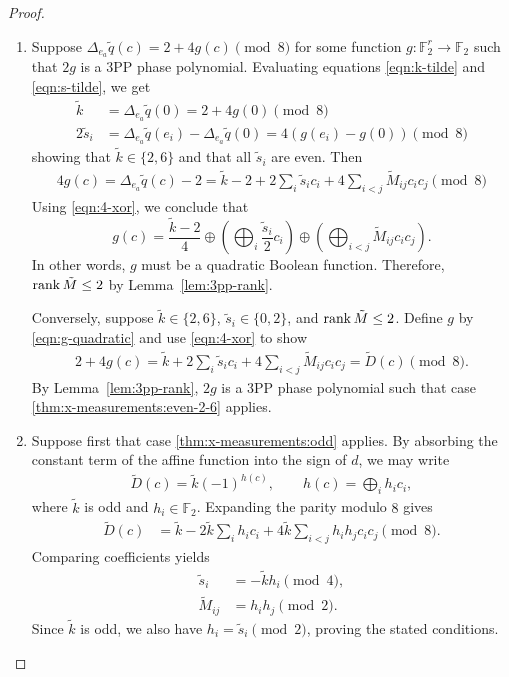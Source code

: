\begin{proof}
\begin{enumerate}
\item
Suppose $\Delta_{e_a}\tilde q(c) = 2 + 4g(c) \pmod 8$ for some function $g: \mathbb F_2^r \to \mathbb F_2$ such that $2g$ is a 3PP phase polynomial.
Evaluating equations \eqref{eqn:k-tilde} and \eqref{eqn:s-tilde}, we get
\begin{align*}
    \tilde k &= \Delta_{e_a}\tilde q(0) = 2 + 4g(0) \pmod 8 \\
    2\tilde s_i &= \Delta_{e_a}\tilde q(e_i) - \Delta_{e_a}\tilde q(0) = 4(g(e_i) - g(0)) \pmod 8
\end{align*}
showing that $\tilde k \in \{2,6\}$ and that all $\tilde s_i$ are even.
Then
\begin{align*}
    4g(c)
    = \Delta_{e_a}\tilde q(c) - 2
    = \tilde k - 2 + 2\sum_i \tilde s_ic_i + 4\sum_{i<j} \tilde M_{ij}c_ic_j \pmod 8
\end{align*}
Using \cref{eqn:4-xor}, we conclude that
\begin{equation} \label{eqn:g-quadratic}
    g(c) = \frac{\tilde k - 2}{4} \oplus \left(\bigoplus_i \frac{\tilde s_i}{2}c_i\right) \oplus \left(\bigoplus_{i<j} \tilde M_{ij}c_ic_j\right).
\end{equation}
In other words, $g$ must be a quadratic Boolean function.
Therefore, $\operatorname{rank} \tilde M \leq 2$ by Lemma~\ref{lem:3pp-rank}.

Conversely, suppose $\tilde k \in \{2, 6\}$, $\tilde s_i \in \{0, 2\}$, and $\operatorname{rank}\tilde M \leq 2$.
Define $g$ by \cref{eqn:g-quadratic} and use \cref{eqn:4-xor} to show
\begin{align}
    2+4g(c)
    =\tilde k+2\sum_i\tilde s_i c_i
    +4\sum_{i<j}\tilde M_{ij}c_ic_j
    =\widetilde D(c)
    \pmod 8.
\end{align}
By Lemma~\ref{lem:3pp-rank}, $2g$ is a 3PP phase polynomial such that case \ref{thm:x-measurements:even-2-6} applies.


\item
Suppose first that case \ref{thm:x-measurements:odd} applies.
By absorbing the constant term of the affine function into the sign of $d$, we may write
\begin{align}
    \widetilde D(c)=\tilde k(-1)^{h(c)},
    \qquad
    h(c)=\bigoplus_i h_i c_i,
\end{align}
where $\tilde k$ is odd and $h_i\in\mathbb F_2$.
Expanding the parity modulo $8$ gives
\begin{align}
    \widetilde D(c)
    &=\tilde k-2\tilde k\sum_i h_i c_i
    +4\tilde k\sum_{i<j}h_ih_jc_ic_j
    \pmod 8.
\end{align}
Comparing coefficients yields
\begin{align}
    \tilde s_i&=-\tilde k h_i\pmod 4,\\
    \tilde M_{ij}&=h_ih_j\pmod 2.
\end{align}
Since $\tilde k$ is odd, we also have $h_i=\tilde s_i\pmod 2$, proving the stated conditions.


\end{enumerate}
\end{proof}
